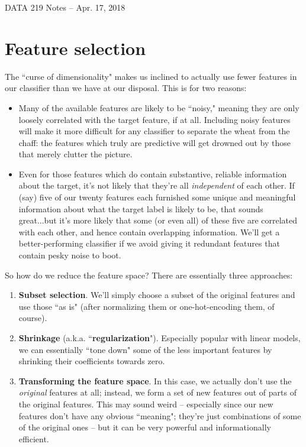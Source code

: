 \documentclass[12pt]{article}
\begin{document}
\begin{center}
\begin{Large}
DATA 219 Notes -- Apr. 17, 2018
\end{Large}
\end{center}

\section{Feature selection}

The ``curse of dimensionality" makes us inclined to actually use fewer
features in our classifier than we have at our disposal. This is for two
reasons:

\begin{itemize}
\itemsep.1em
\item Many of the available features are likely to be ``noisy," meaning they
are only loosely correlated with the target feature, if at all. Including
noisy features will make it more difficult for any classifier to separate the
wheat from the chaff: the features which truly are predictive will get drowned
out by those that merely clutter the picture.

\item Even for those features which do contain substantive, reliable
information about the target, it's not likely that they're all
\textit{independent} of each other. If (say) five of our twenty features each
furnished some unique and meaningful information about what the target label
is likely to be, that sounds great...but it's more likely that some (or even
all) of these five are correlated with each other, and hence contain
overlapping information. We'll get a better-performing classifier if we
avoid giving it redundant features that contain pesky noise to boot.

\end{itemize}

So how do we reduce the feature space? There are essentially three approaches:

\begin{enumerate}
\itemsep.1em
\item \textbf{Subset selection}. We'll simply choose a subset of the original
features and use those ``as is" (after normalizing them or one-hot-encoding
them, of course).
\item \textbf{Shrinkage} (a.k.a. ``\textbf{regularization}"). Especially
popular with linear models, we can essentially ``tone down" some of the less
important features by shrinking their coefficients towards zero.
\item \textbf{Transforming the feature space}. In this case, we actually don't
use the \textit{original} features at all; instead, we form a set of
new features out of parts of the original features. This may sound weird --
especially since our new features don't have any obvious ``meaning"; they're
just combinations of some of the original ones -- but it can be very powerful
and informationally efficient.
\end{enumerate}
\end{document}
